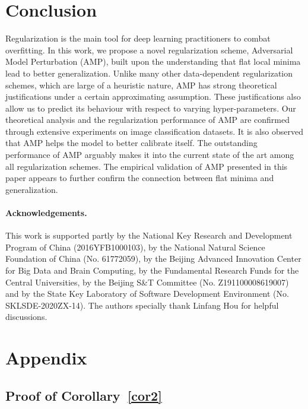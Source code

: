 \documentclass[final]{cvpr}
\begin{document}
\section{Conclusion}

Regularization is the main tool for deep learning practitioners to combat overfitting. In this work, we propose a novel regularization scheme, Adversarial Model Perturbation (AMP), built upon the understanding that flat local minima lead to better generalization. Unlike many other data-dependent regularization schemes, which are large of a heuristic nature, AMP has strong theoretical justifications under a certain approximating assumption. These justifications also allow us to predict its behaviour with respect to varying hyper-parameters. Our theoretical analysis and the regularization performance of AMP are confirmed through extensive experiments on image classification datasets. It is also observed that AMP helps the model to better calibrate itself. The outstanding performance of AMP arguably makes it into the current state of the art among all regularization schemes. The empirical validation of AMP presented in this paper appears to further confirm the connection between flat minima and generalization.

\paragraph{Acknowledgements.}
This work is supported partly by the National Key Research and Development Program of China (2016YFB1000103), by the National Natural Science Foundation of China (No. 61772059), by the Beijing Advanced Innovation Center for Big Data and Brain Computing, by the Fundamental Research Funds for the Central Universities, by the Beijing S\&T Committee (No. Z191100008619007) and by the State Key Laboratory of Software Development Environment (No. SKLSDE-2020ZX-14). The authors specially thank Linfang Hou for helpful discussions.

{\small


}

\clearpage

\section*{Appendix}

\renewcommand{\thesubsection}{\Alph{subsection}}

\subsection{Proof of Corollary~\ref{cor2}}\label{app:a}
\end{document}
